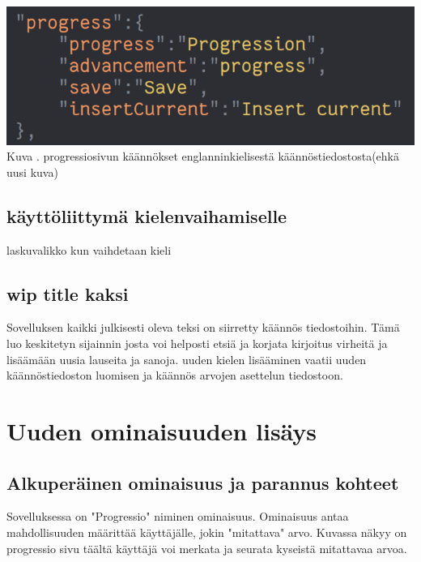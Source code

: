 \documentclass[11pt,a4paper,titlepage,oneside]{article}
\begin{document}
\includegraphics[width = 15cm]{src/public/oppar/translationfileEng.png}\\
Kuva \getImgCount {}. progressiosivun käännökset englanninkielisestä käännöstiedostosta(ehkä uusi kuva)
\medskip

\subsection{käyttöliittymä kielenvaihamiselle}

laskuvalikko kun vaihdetaan kieli


\subsection{wip title kaksi}
Sovelluksen kaikki julkisesti oleva teksi on siirretty käännös tiedostoihin. 
Tämä luo keskitetyn sijainnin josta voi helposti etsiä ja korjata kirjoitus virheitä ja lisäämään uusia lauseita ja sanoja.
uuden kielen lisääminen vaatii uuden käännöstiedoston luomisen ja käännös arvojen asettelun tiedostoon.
\medskip














\newpage
\section{Uuden ominaisuuden lisäys}

\subsection{Alkuperäinen ominaisuus ja parannus kohteet}


Sovelluksessa on "Progressio"{} niminen ominaisuus. 
Ominaisuus antaa mahdollisuuden määrittää käyttäjälle, jokin "mitattava"{} arvo.
Kuvassa \nextImageCount {} näkyy on progressio sivu täältä käyttäjä voi merkata ja seurata kyseistä mitattavaa arvoa.
\medskip
\bigskip
\end{document}
